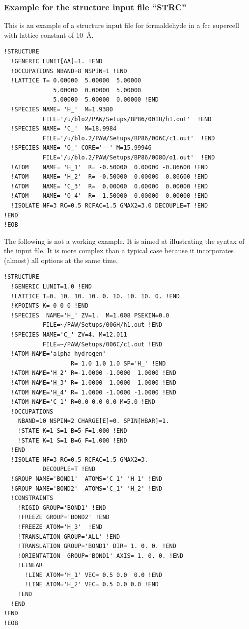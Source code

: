 \documentclass[final,12pt]{article}
\begin{document}
\subsubsection{Example for the structure input file ``STRC''}
This is an example of a structure input file for formaldehyde in a fcc
supercell with lattice constant of 10~\AA.
\begin{verbatim}
!STRUCTURE
  !GENERIC LUNIT[AA]=1. !END   
  !OCCUPATIONS NBAND=8 NSPIN=1 !END
  !LATTICE T= 0.00000  5.00000  5.00000               
              5.00000  0.00000  5.00000               
              5.00000  5.00000  0.00000 !END
  !SPECIES NAME= 'H_'  M=1.9380 
           FILE='/u/blo2/PAW/Setups/BP86/001H/h1.out'  !END 
  !SPECIES NAME= 'C_'  M=18.9984 
           FILE='/u/blo.2/PAW/Setups/BP86/006C/c1.out'  !END 
  !SPECIES NAME= 'O_' CORE='--' M=15.99946 
           FILE='/u/blo.2/PAW/Setups/BP86/008O/o1.out'  !END 
  !ATOM    NAME= 'H_1'  R= -0.50000  0.00000 -0.86600 !END
  !ATOM    NAME= 'H_2'  R= -0.50000  0.00000  0.86600 !END
  !ATOM    NAME= 'C_3'  R=  0.00000  0.00000  0.00000 !END
  !ATOM    NAME= 'O_4'  R=  1.50000  0.00000  0.00000 !END
  !ISOLATE NF=3 RC=0.5 RCFAC=1.5 GMAX2=3.0 DECOUPLE=T !END 
!END 
!EOB 
\end{verbatim}
The following is not a working example. It is aimed at illustrating
the syntax of the input file. It is more complex than a typical case
because it incorporates (almost) all options at the same time.
\begin{verbatim}
!STRUCTURE 
  !GENERIC LUNIT=1.0 !END 
  !LATTICE T=0. 10. 10. 10. 0. 10. 10. 10. 0. !END 
  !KPOINTS K= 0 0 0 !END 
  !SPECIES  NAME='H_' ZV=1.  M=1.008 PSEKIN=0.0
           FILE=~/PAW/Setups/006H/h1.out !END 
  !SPECIES NAME='C_' ZV=4. M=12.011 
           FILE=~/PAW/Setups/006C/c1.out !END 
  !ATOM NAME='alpha-hydrogen' 
                   R= 1.0 1.0 1.0 SP='H_' !END 
  !ATOM NAME='H_2' R=-1.0000 -1.0000  1.0000 !END 
  !ATOM NAME='H_3' R=-1.0000  1.0000 -1.0000 !END 
  !ATOM NAME='H_4' R= 1.0000 -1.0000 -1.0000 !END 
  !ATOM NAME='C_1' R=0.0 0.0 0.0 M=5.0 !END
  !OCCUPATIONS 
    NBAND=10 NSPIN=2 CHARGE[E]=0. SPIN[HBAR]=1. 
    !STATE K=1 S=1 B=5 F=1.000 !END 
    !STATE K=1 S=1 B=6 F=1.000 !END 
  !END
  !ISOLATE NF=3 RC=0.5 RCFAC=1.5 GMAX2=3. 
           DECOUPLE=T !END 
  !GROUP NAME='BOND1'  ATOMS='C_1' 'H_1' !END 
  !GROUP NAME='BOND2'  ATOMS='C_1' 'H_2' !END 
  !CONSTRAINTS
    !RIGID GROUP='BOND1' !END 
    !FREEZE GROUP='BOND2' !END 
    !FREEZE ATOM='H_3'  !END 
    !TRANSLATION GROUP='ALL' !END
    !TRANSLATION GROUP='BOND1' DIR= 1. 0. 0. !END
    !ORIENTATION  GROUP='BOND1' AXIS= 1. 0. 0. !END
    !LINEAR 
      !LINE ATOM='H_1' VEC= 0.5 0.0  0.0 !END 
      !LINE ATOM='H_2' VEC= 0.5 0.0 0.0 !END 
    !END 
  !END
!END 
!EOB
\end{verbatim}
\end{document}
